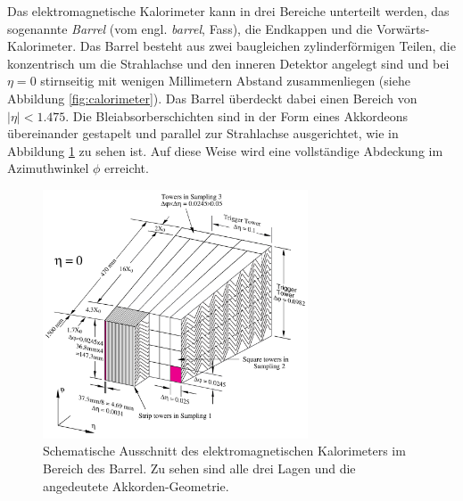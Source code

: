 Das elektromagnetische Kalorimeter kann in drei Bereiche unterteilt werden, das
sogenannte \textit{Barrel} (vom engl. \textit{barrel}, Fass), die Endkappen
und die Vorwärts-Kalorimeter. Das Barrel besteht aus zwei baugleichen
zylinderförmigen Teilen, die konzentrisch um die Strahlachse und den inneren
Detektor angelegt sind und bei $\eta=0$ stirnseitig mit wenigen Millimetern
Abstand zusammenliegen (siehe Abbildung \ref{fig:calorimeter}). Das Barrel
überdeckt dabei einen Bereich von $|\eta| < 1.475$. Die Bleiabsorberschichten
sind in der Form eines Akkordeons übereinander gestapelt und parallel zur
Strahlachse ausgerichtet, wie in Abbildung \ref{fig:accordion} zu sehen ist.
Auf diese Weise wird eine vollständige Abdeckung im Azimuthwinkel $\phi$
erreicht.

\begin{figure}[h]
    \centering
    \includegraphics[width=0.7\textwidth]{img/accordion}
    \caption[Schematischer Ausschnitt des elektromagnetischen Kalorimeters]
        {Schematische Ausschnitt des elektromagnetischen Kalorimeters im
        Bereich des Barrel. Zu sehen sind alle drei Lagen und die angedeutete
        Akkorden-Geometrie.}
    \label{fig:accordion}
\end{figure}

